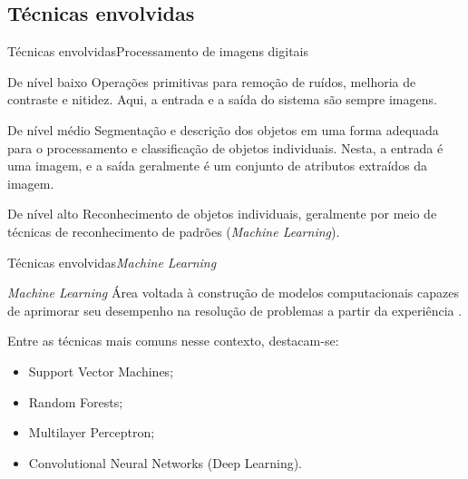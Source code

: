 \documentclass{beamer}
\begin{document}
    \subsection{Técnicas envolvidas}

        \begin{frame}{Técnicas envolvidas}{Processamento de imagens digitais}
            \begin{block}{De nível baixo}
                Operações primitivas para remoção de ruídos, melhoria de
                contraste e nitidez. Aqui, a entrada e a saída
                do sistema são sempre imagens.
            \end{block}
            \begin{block}{De nível médio}
                Segmentação e descrição dos objetos em uma forma 
                adequada para o processamento e classificação de objetos individuais.
                Nesta, a entrada é uma imagem, e a saída geralmente é um
                conjunto de atributos extraídos da imagem.
            \end{block}
            \begin{block}{De nível alto}
                Reconhecimento de objetos individuais,
                geralmente por meio de técnicas de reconhecimento de padrões (\emph{Machine Learning}). 
            \end{block}
        \end{frame}

        \begin{frame}{Técnicas envolvidas}{\emph{Machine Learning}}
            
            \begin{block}{\emph{Machine Learning}}
                Área voltada à construção de modelos computacionais capazes de 
                aprimorar seu desempenho na resolução de problemas a partir da experiência 
                \cite{mitchell1997}.
            \end{block}
            
            \vspace{.3cm}

            \pause
        
            Entre as técnicas mais comuns nesse contexto, destacam-se:
            \begin{itemize}
                \item<3-> Support Vector Machines;
                \item<4-> Random Forests;
                \item<5-> Multilayer Perceptron;
                \item<6-> Convolutional Neural Networks (Deep Learning).
            \end{itemize}
        
        \end{frame}
\end{document}
